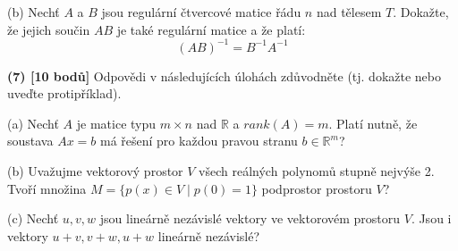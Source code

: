 \documentclass[a4paper,11pt]{article}
\begin{document}
\vspace{5cm}

\noindent
(b) Nechť $A$ a $B$ jsou regulární čtvercové matice řádu $n$ nad tělesem $T$. Dokažte, že jejich součin $AB$ je také regulární matice a že platí:
$$ (AB)^{-1} = B^{-1}A^{-1} $$

\vspace{6cm}

\noindent
\textbf{(7) [10 bodů]} Odpovědi v následujících úlohách zdůvodněte (tj. dokažte nebo uveďte protipříklad).

\vspace{3mm}

\noindent
(a) Nechť $A$ je matice typu $m \times n$ nad $\mathbb{R}$ a $rank(A) = m$. Platí nutně, že soustava $Ax=b$ má řešení pro každou pravou stranu $b \in \mathbb{R}^m$?

\vspace{4cm}

\noindent
(b) Uvažujme vektorový prostor $V$ všech reálných polynomů stupně nejvýše 2. Tvoří množina $M = \{ p(x) \in V \mid p(0) = 1 \}$ podprostor prostoru $V$?

\vspace{4cm}

\noindent
(c) Nechť $u, v, w$ jsou lineárně nezávislé vektory ve vektorovém prostoru $V$. Jsou i vektory $u+v, v+w, u+w$ lineárně nezávislé?
\end{document}

